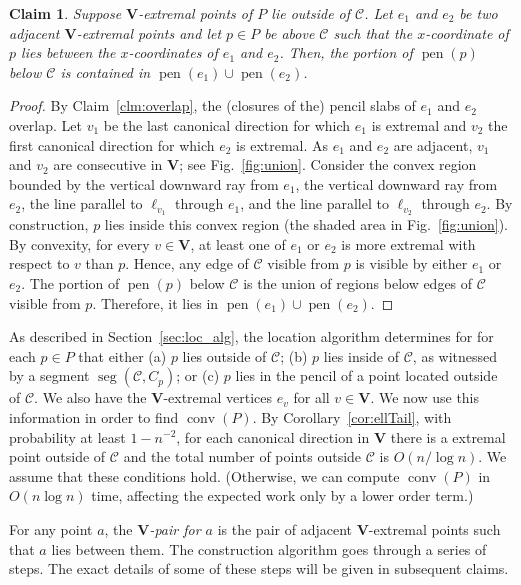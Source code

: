 \documentclass[letterpaper,11pt]{article}
\newtheorem{claim}[theorem]{Claim}
\DeclareMathOperator{\UH}{conv}
\DeclareMathOperator{\seg}{seg}
\DeclareMathOperator{\pen}{pen}
\newcommand{\cC}{\mathcal{C}}
\begin{document}
\begin{claim}\label{clm:extremal_pencil}
  Suppose \textup{$\textbf{V}$}-extremal 
  points of $P$ lie outside
  of $\cC$. Let $e_1$ and $e_2$ be 
  two adjacent \textup{$\textbf{V}$}-extremal 
  points and let $p \in P$ be above $\cC$ 
  such that the $x$-coordinate of
  $p$ lies between the $x$-coordinates of $e_1$ 
  and $e_2$.  Then, the portion of $\pen(p)$ 
  below $\cC$ is contained 
  in $\pen(e_1) \cup \pen(e_2)$.
\end{claim}

\begin{proof} 
By Claim~\ref{clm:overlap}, the 
(closures of the) pencil slabs 
of $e_1$ and $e_2$ overlap.
Let $v_1$ be the last canonical 
direction for which $e_1$ is extremal 
and $v_2$ the first canonical direction 
for which $e_2$ is extremal. As $e_1$ and $e_2$ 
are adjacent, $v_1$ and $v_2$ are 
consecutive in $\textbf{V}$; see 
Fig.~\ref{fig:union}.
Consider the convex region bounded 
by the vertical downward
ray from $e_1$, the vertical 
downward ray from $e_2$, the line parallel
to $\ell_{v_1}$ through $e_1$, and the line 
parallel to $\ell_{v_2}$ through 
$e_2$. By construction, $p$ lies inside 
this convex region (the shaded
area in Fig.~\ref{fig:union}). 
By convexity, for every 
$v \in \textbf{V}$, at 
least one of $e_1$ 
or $e_2$ is more extremal with respect 
to $v$ than $p$. Hence,
any edge of $\cC$ visible from $p$ is 
visible by either $e_1$ or $e_2$.
The portion of $\pen(p)$ below 
$\cC$ is the union of 
regions below edges of $\cC$ visible 
from $p$. Therefore, it 
lies in $\pen(e_1) \cup \pen(e_2)$.
\end{proof}

As described in Section~\ref{sec:loc_alg},
the location algorithm determines 
for for each $p \in P$ that
either
(a) $p$ lies outside of $\cC$;
(b) $p$ lies inside of $\cC$, as witnessed 
by a segment $\seg(\cC, C_p)$; or
(c) $p$ lies in the pencil of a 
point located outside of $\cC$.
We also have the $\textbf{V}$-extremal 
vertices $e_v$ for all $v \in \textbf{V}$.
We now use this information in order to 
find $\UH(P)$. By Corollary~\ref{cor:ellTail}, with
probability at least $1 - n^{-2}$,
for each canonical direction in $\textbf{V}$ 
there is a extremal point
outside of $\cC$ and the total number 
of points outside $\cC$ is $O(n/\log n)$.
We assume that these conditions 
hold. (Otherwise, we can compute $\UH(P)$ 
in $O(n\log n)$ time, affecting the expected
work only by a lower order term.)

For any point $a$, the 
\emph{$\textbf{V}$-pair for $a$} is the pair
of adjacent $\textbf{V}$-extremal points 
such that $a$ lies between them.
The construction algorithm goes through a series 
of steps. The exact details
of some of these steps will be given 
in subsequent claims.
\medskip
\end{document}
